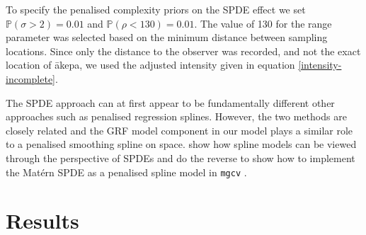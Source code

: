 \documentclass{stylefile16/statsoc}
\newcommand{\akepa}{\textquotesingle\={a}kepa}  %
\begin{document}
To specify the penalised complexity priors on the SPDE effect we set $\mathbb{P}(\sigma > 2) = 0.01$ and $\mathbb{P}(\rho < 130) = 0.01$.  The value of 130 for the range parameter was selected based on the minimum distance between sampling locations.  Since only the distance to the observer was recorded, and not the exact location of \akepa{}, we used the adjusted intensity given in equation \eqref{intensity-incomplete}.

The SPDE approach can at first appear to be fundamentally different  other approaches such as penalised regression splines.  However, the two methods are closely related and the GRF model component in our model plays a similar role to a penalised smoothing spline on space.  \cite{yue_bayesian_2014} show how spline models can be viewed through the perspective of SPDEs and \cite{ miller_understanding_2019} do the reverse to show how to implement the Mat\'ern SPDE as a penalised spline model in \texttt{mgcv} \citep{wood_gam_2017}.

\section{Results}
\label{sec-results} 
\end{document}
